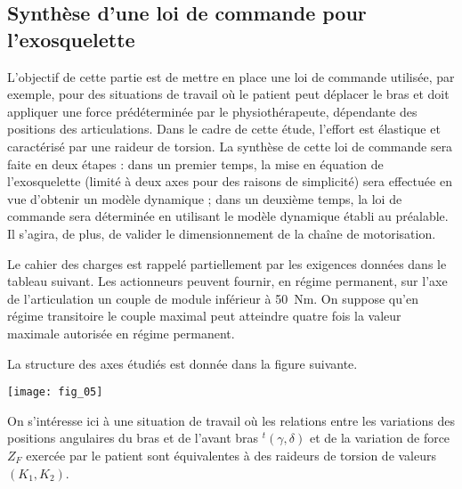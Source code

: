 \setcounter{exo}{0}
\begin{multicols}{2}


\subsection*{Synthèse d’une loi de commande pour l’exosquelette}

\begin{obj}
L’objectif de cette partie est de mettre en place une loi de commande utilisée, par exemple, pour des
situations de travail où le patient peut déplacer le bras et doit appliquer une force prédéterminée par le
physiothérapeute, dépendante des positions des articulations. Dans le cadre de cette étude, l’effort est
élastique et caractérisé par une raideur de torsion. La synthèse de cette loi de commande sera faite en
deux étapes : dans un premier temps, la mise en équation de l’exosquelette (limité à deux axes pour des
raisons de simplicité) sera effectuée en vue d’obtenir un modèle dynamique ; dans un deuxième temps,
la loi de commande sera déterminée en utilisant le modèle dynamique établi au préalable. Il s’agira, de
plus, de valider le dimensionnement de la chaîne de motorisation.
\end{obj}

Le cahier des charges est rappelé partiellement par les exigences données dans le tableau suivant. Les actionneurs peuvent fournir, en régime permanent, sur l’axe de l’articulation un
couple de module inférieur à \SI{50}{Nm}. On suppose qu’en régime transitoire le couple maximal peut atteindre quatre fois la valeur maximale autorisée en régime permanent.

La structure des axes étudiés est donnée dans la figure suivante.

\begin{center}
\texttt{[image: fig\_05]}
\end{center}



On s’intéresse ici à une situation de travail où les relations entre les variations des positions angulaires du
bras et de l’avant bras $ ^t(\gamma,\delta)$ et de la variation de force $Z_F$ exercée par le patient sont équivalentes à des raideurs de torsion de valeurs $(K_1,K_2)$.



\end{multicols}
